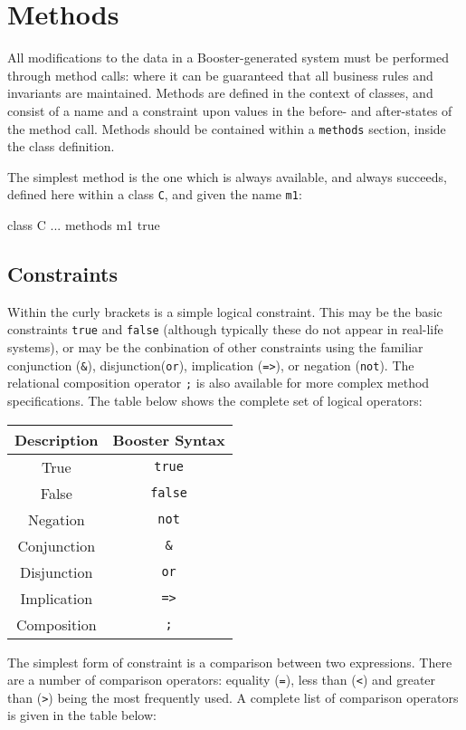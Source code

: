 \section{Methods}

All modifications to the data in a Booster-generated system must be
performed through method calls: where it can be guaranteed that all
business rules and invariants are maintained.  Methods are defined in
the context of classes, and consist of a name and a constraint upon
values in the before- and after-states of the method call.  Methods
should be contained within a \verb|methods| section, inside the class
definition.

The simplest method is the one which is always available, and always
succeeds, defined here within a class \verb|C|, and given the name \verb|m1|:

\begin{code}
class C {
  ...
  methods
    m1 { true }
}    
\end{code}

\subsection{Constraints}
Within the curly brackets is a simple logical constraint.  This may be
the basic constraints \verb|true| and \verb|false| (although typically
these do not appear in real-life systems), or may be the conbination
of other constraints using the familiar conjunction (\verb|&|),
disjunction(\verb|or|), implication (\verb|=>|), or negation
(\verb|not|).  The relational composition operator \verb|;| is also
available for more complex method specifications.  The table below
shows the complete set of logical operators:

\begin{center}
  \begin{tabular} { | c | c | } 
  \hline
  \textbf{Description} & \textbf{Booster Syntax} \\ \hline
  True & \verb|true| \\ \hline
  False & \verb|false| \\ \hline
  Negation & \verb|not| \\ \hline
  Conjunction & \verb|&| \\ \hline
  Disjunction & \verb|or| \\ \hline
  Implication & \verb|=>| \\ \hline
  Composition & \verb|;| \\ \hline
  \end{tabular}
\end{center}
The simplest form of constraint is a comparison between two
expressions.  There are a number of comparison operators: equality
(\verb|=|), less than (\verb|<|) and greater than (\verb|>|) being the
most frequently used.  A complete list of comparison operators is
given in the table below:

